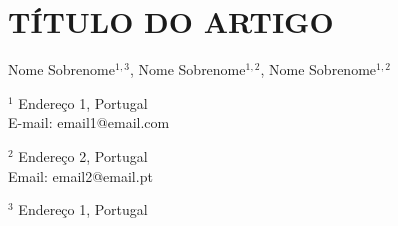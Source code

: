 \documentclass[11pt,twoside]{article}
\begin{document}

\section*{TÍTULO DO ARTIGO}

\vspace{10pt}


Nome Sobrenome$^{1,3}$, Nome Sobrenome$^{1,2}$, Nome Sobrenome$^{1,2}$

\vspace{10pt}



{
\center

    \footnotesize

$^{1}$ Endereço 1, Portugal \\
E-mail: email1@email.com

\vspace{3pt}

$^{2}$ Endereço 2, Portugal \\
Email:  email2@email.pt

\vspace{3pt}

$^{3}$ Endereço 1, Portugal

}

\vspace{25pt}

\end{document}
